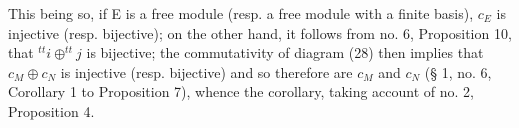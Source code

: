 This being so, if E is a free module (resp. a free module with a finite basis), \(c_{E}\) is injective (resp. bijective); on the other hand, it follows from no. 6, Proposition 10, that \(^{tt}i \oplus ^{tt}j\) is bijective; the commutativity of diagram (28) then implies that \(c_{M} \oplus c_{N}\) is injective (resp. bijective) and so therefore are \(c_{M}\) and \(c_{N}\) (§ 1, no. 6, Corollary 1 to Proposition 7), whence the corollary, taking account of no. 2, Proposition 4.

